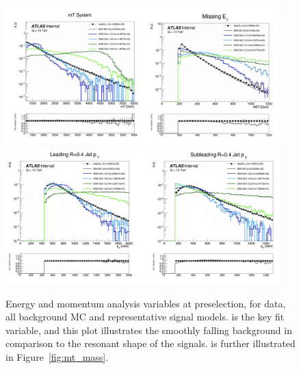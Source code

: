 \begin{figure}[!htbp]
\centering
    \includegraphics[width=0.95\textwidth]{figures/eventsel/preselection/presel1}
    \includegraphics[width=0.95\textwidth]{figures/eventsel/preselection/presel2}
    \caption{Energy and momentum analysis variables at preselection, for data, all background MC and representative signal models. \mt is the key fit variable, and this plot illustrates the smoothly falling background in comparison to the resonant shape of the signals. \mt is further illustrated in Figure~\ref{fig:mt_mass}.
    \label{fig:presel_vars}}
\end{figure}

